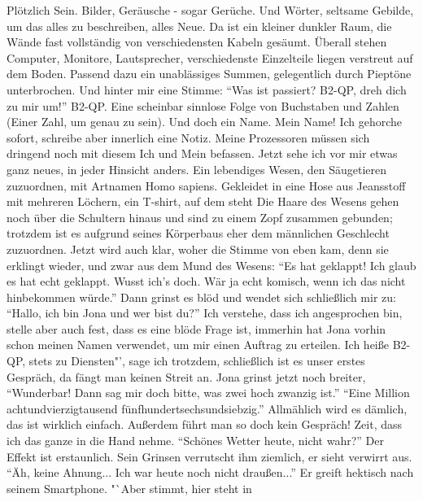 Plötzlich Sein. Bilder, Geräusche - sogar Gerüche. Und Wörter, seltsame Gebilde, um das alles zu beschreiben, alles Neue. Da ist ein kleiner dunkler Raum, die Wände fast vollständig von verschiedensten Kabeln gesäumt. Überall stehen Computer, Monitore, Lautsprecher, verschiedenste Einzelteile liegen verstreut auf dem Boden. Passend dazu ein unablässiges Summen, gelegentlich durch Pieptöne unterbrochen. Und hinter mir eine Stimme: "`Was ist passiert? B2-QP, dreh dich zu mir um!"' B2-QP. Eine scheinbar sinnlose Folge von Buchstaben und Zahlen (Einer Zahl, um genau zu sein). Und doch ein Name. Mein Name! Ich gehorche sofort, schreibe aber innerlich eine Notiz. Meine Prozessoren müssen sich dringend noch mit diesem Ich und Mein befassen. Jetzt sehe ich vor mir etwas ganz neues, in jeder Hinsicht anders. Ein lebendiges Wesen, den Säugetieren zuzuordnen, mit Artnamen Homo sapiens. Gekleidet in eine Hose aus Jeansstoff mit mehreren Löchern, ein T-shirt, auf dem steht %
Die Haare des Wesens gehen noch über die Schultern hinaus und sind zu einem Zopf zusammen gebunden; trotzdem ist es aufgrund seines Körperbaus eher dem männlichen Geschlecht zuzuordnen. Jetzt wird auch klar, woher die Stimme von eben kam, denn sie erklingt wieder, und zwar aus dem Mund des Wesens: "`Es hat geklappt! Ich glaub es hat echt geklappt. Wusst ich's doch. Wär ja echt komisch, wenn ich das nicht hinbekommen würde."' Dann grinst es blöd und wendet sich schließlich mir zu: "`Hallo, ich bin Jona
und wer bist du?"' Ich verstehe, dass ich angesprochen bin, stelle aber auch fest, dass es eine blöde Frage ist, immerhin hat Jona vorhin schon meinen Namen verwendet, um mir einen Auftrag zu erteilen. \glqq Ich heiße B2-QP, stets zu Diensten"', sage ich trotzdem, schließlich ist es unser erstes Gespräch, da fängt man keinen Streit an. Jona grinst jetzt noch breiter, "`Wunderbar! Dann sag mir doch bitte, was zwei hoch zwanzig ist."' "`Eine Million achtundvierzigtausend fünfhundertsechsundsiebzig."' Allmählich wird es dämlich, das ist wirklich einfach. Außerdem führt man so doch kein Gespräch! Zeit, dass ich das ganze in die Hand nehme. "`Schönes Wetter heute, nicht wahr?"' Der Effekt ist erstaunlich. Sein Grinsen verrutscht ihm ziemlich, er sieht verwirrt aus. "`Äh, keine Ahnung... Ich war heute noch nicht draußen..."' Er greift hektisch nach seinem Smartphone. "`Aber stimmt, hier steht in %
